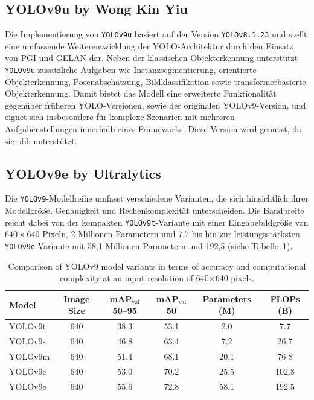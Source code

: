 \subsection{YOLOv9u by Wong Kin Yiu}
\label{subsec:yolov9u}

Die Implementierung von \texttt{YOLOv9u} basiert auf der Version \texttt{YOLOv8.1.23}\cite{yolo_v9u_github} und stellt eine umfassende Weiterentwicklung der \acrshort{YOLO}-Architektur durch den Einsatz von \acrshort{PGI} und \acrshort{GELAN} dar. Neben der klassischen Objekterkennung unterstützt \texttt{YOLOv9u} zusätzliche Aufgaben wie Instanzsegmentierung, orientierte Objekterkennung, Posenabschätzung, Bildklassifikation sowie transformerbasierte Objekterkennung\cite{wang2024}. Damit bietet das Modell eine erweiterte Funktionalität gegenüber früheren \acrshort{YOLO}-Versionen, sowie der originalen \acrshort{YOLO}v9-Version, und eignet sich insbesondere für komplexe Szenarien mit mehreren Aufgabenstellungen innerhalb eines Frameworks. Diese Version wird genutzt, da sie \acrlong{obb} unterstützt.

\subsection{YOLOv9e by Ultralytics}
\label{subsec:yolov9e}

Die \texttt{YOLOv9}-Modellreihe umfasst verschiedene Varianten, die sich hinsichtlich ihrer Modellgröße, Genauigkeit und Rechenkomplexität unterscheiden. Die Bandbreite reicht dabei von der kompakten \texttt{YOLOv9t}-Variante mit einer Eingabebildgröße von $640 \times 640$ Pixeln, 2 Millionen Parametern und 7{,}7  bis hin zur leistungsstärksten \texttt{YOLOv9e}-Variante mit 58{,}1 Millionen Parametern und 192{,}5  (siehe Tabelle~\ref{tab:yolov9-models}). 
\begin{table}[h]
\centering
\begin{tabular}{l|c|c|c|c|c} %
\textbf{Model} & \textbf{Image Size} & \textbf{mAP$_{\text{val}}$ 50--95} & \textbf{mAP$_{\text{val}}$ 50} & \textbf{Parameters (M)} & \textbf{FLOPs (B)} \\
\hline
YOLOv9t & 640 & 38.3 & 53.1 & 2.0 & 7.7 \\
YOLOv9s & 640 & 46.8 & 63.4 & 7.2 & 26.7 \\
YOLOv9m & 640 & 51.4 & 68.1 & 20.1 & 76.8 \\
YOLOv9c & 640 & 53.0 & 70.2 & 25.5 & 102.8 \\
YOLOv9e & 640 & 55.6 & 72.8 & 58.1 & 192.5 \\
\end{tabular}
\caption{Comparison of YOLOv9 model variants in terms of accuracy and computational complexity at an input resolution of 640$\times$640 pixels.}
\label{tab:yolov9-models}
\end{table}




